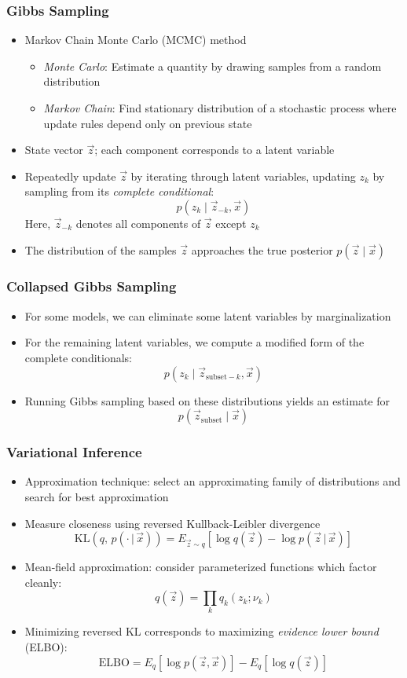 \begin{frame}
\frametitle{Gibbs Sampling}
\begin{itemize}[<+->]
\item Markov Chain Monte Carlo (MCMC) method
    \begin{itemize}[<+->]
    \item \emph{Monte Carlo}: Estimate a quantity by drawing samples from a random distribution
    \item \emph{Markov Chain}: Find stationary distribution of a stochastic process where update rules depend only on previous state
    \end{itemize}
\item State vector $\vec z$; each component corresponds to a latent variable
\item Repeatedly update $\vec z$ by iterating through latent variables, updating $z_k$ by sampling from its \emph{complete conditional}:
\[ p(z_k \mid \vec z_{-k}, \vec x) \]
Here, $\vec z_{-k}$ denotes all components of $\vec z$ except $z_k$
\item The distribution of the samples $\vec z$ approaches the true posterior $p(\vec z \mid \vec x)$
\end{itemize}
\end{frame}

\begin{frame}
\frametitle{Collapsed Gibbs Sampling}
\begin{itemize}[<+->]
\item For some models, we can eliminate some latent variables by marginalization
\item For the remaining latent variables, we compute a modified form of the complete conditionals:
\[ p(z_k \mid \vec z_{\text{subset}-k}, \vec x) \]
\item Running Gibbs sampling based on these distributions yields an estimate for
\[ p(\vec z_{\text{subset}} \mid \vec x) \]
\end{itemize}
\end{frame}

\begin{frame}
\frametitle{Variational Inference}
\begin{itemize}[<+->]
\item Approximation technique: select an approximating family of distributions and search for best approximation
\item Measure closeness using reversed Kullback-Leibler divergence
\[ \text{KL}(q,\, p(\cdot \,\vert\, \vec x))
= E_{\vec z \sim q}[\log q(\vec z) - \log p(\vec z \,\vert\, \vec x)] \]
\item Mean-field approximation: consider parameterized functions which factor cleanly:
\[ q(\vec z) = \prod_k q_k(z_k; \nu_k) \]
\item Minimizing reversed KL corresponds to maximizing \emph{evidence lower bound} (ELBO):
\[ \text{ELBO} = E_q[\log p(\vec z, \vec x)] - E_q[\log q(\vec z)] \]
\end{itemize}
\end{frame}

